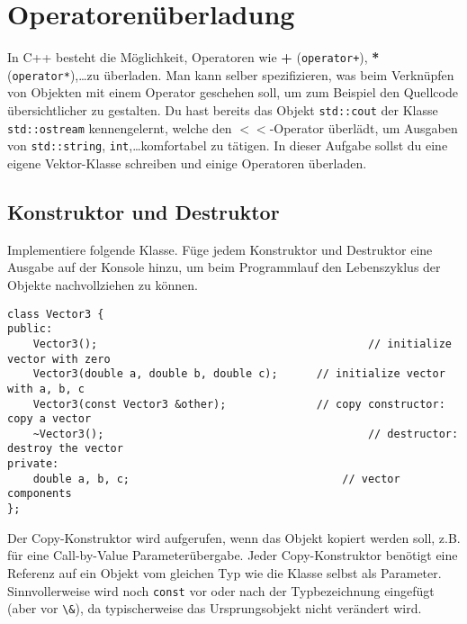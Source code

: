 \section{Operatorenüberladung}
In C++ besteht die Möglichkeit, Operatoren wie \textbf{+} (\lstinline{operator+}), \textbf{*} (\lstinline{operator*}),\dots zu überladen.
Man kann selber spezifizieren, was beim Verknüpfen von Objekten mit einem Operator geschehen soll, um zum Beispiel den Quellcode übersichtlicher zu gestalten.
Du hast bereits das Objekt \lstinline{std::cout} der Klasse \lstinline{std::ostream} kennengelernt, welche den $<<$-Operator überlädt, um Ausgaben von \lstinline{std::string}, \lstinline{int},\dots komfortabel zu tätigen.
In dieser Aufgabe sollst du eine eigene Vektor-Klasse schreiben und einige Operatoren überladen.


\subsection{Konstruktor und Destruktor}
Implementiere folgende Klasse.
Füge jedem Konstruktor und Destruktor eine Ausgabe auf der Konsole hinzu, um beim Programmlauf den Lebenszyklus der Objekte nachvollziehen zu können.

\begin{lstlisting}
class Vector3 {
public:
	Vector3();											// initialize vector with zero
	Vector3(double a, double b, double c);		// initialize vector with a, b, c
	Vector3(const Vector3 &other);				// copy constructor: copy a vector
	~Vector3();											// destructor: destroy the vector
private:
	double a, b, c;									// vector components
};
\end{lstlisting}

Der Copy-Konstruktor wird aufgerufen, wenn das Objekt kopiert werden soll, z.B. für eine Call-by-Value Parameterübergabe.
Jeder Copy-Konstruktor benötigt eine Referenz auf ein Objekt vom gleichen Typ wie die Klasse selbst als Parameter. 
Sinnvollerweise wird noch \lstinline{const} vor oder nach der Typbezeichnung eingefügt (aber vor \lstinline{\&}), da typischerweise das Ursprungsobjekt nicht verändert wird.

